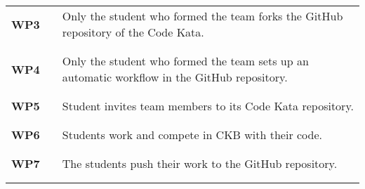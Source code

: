 \begin{table}[H]
\begin{tabular}{l l p{12cm}}
        \textbf{WP3} & \vline & Only the student who formed the team forks the GitHub repository of the Code Kata.                                                                              \\
                     &        &                                                                                                                                                                 \\\hline & & \\
        \textbf{WP4} & \vline & Only the student who formed the team sets up an automatic workflow in the GitHub repository.                                                                    \\
                     &        &                                                                                                                                                                 \\\hline & & \\
        \textbf{WP5} & \vline & Student invites team members to its Code Kata repository.                                                                                                       \\
                     &        &                                                                                                                                                                 \\\hline & & \\
        \textbf{WP6} & \vline & Students work and compete in CKB with their code.                                                                                                               \\
                     &        &                                                                                                                                                                 \\\hline & & \\
        \textbf{WP7} & \vline & The students push their work to the GitHub repository.                                                                                                          \\
                     &        &                                                                                                                                                                 \\\hline & & \\

\end{tabular}
\end{table}
